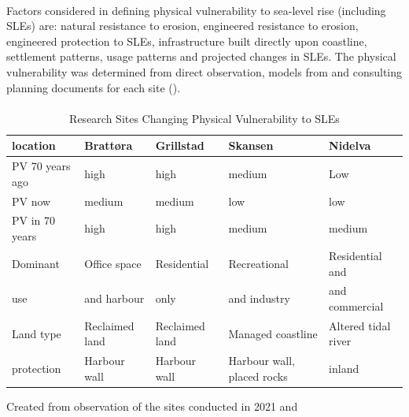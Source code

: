 \paragraph{}


Factors considered in defining physical vulnerability to sea-level rise (including SLEs) are: natural resistance to erosion, engineered resistance to erosion, engineered protection to SLEs, infrastructure built directly upon coastline, settlement patterns, usage patterns and projected changes in SLEs. The physical vulnerability was determined from direct observation,  models from \cite{kartverket_se_2020} and consulting planning documents for each site (\cite{miljoenheten_og_byplankontoret_trondheim_kommune_9-notat-om-havnivastigning-og-stormflo---hensyn-i-arealplanlegging-nyhavnapdf_2020}). 


\paragraph{}
\begin{table}[!ht]
    \centering
    \begin{tabular}{|l|l|l|l|l|}
    \hline
        \textbf{location} & \textbf{Brattøra} & \textbf{Grillstad} & \textbf{Skansen}  & \textbf{Nidelva} \\ \hline
        PV 70 years ago & high & high & medium & Low \\ \hline
        PV now &  medium &  medium &  low &  low \\ \hline
        PV in 70 years &  high &  high &  medium &  medium \\ \hline
        Dominant & Office space  & Residential & Recreational  & Residential and \\ \newline
        use & and harbour &  only   &  and industry & and commercial  \\ \hline
        Land type & Reclaimed land & Reclaimed land & Managed coastline  & Altered tidal river \\ \hline
        protection & Harbour wall & Harbour wall & Harbour wall, placed rocks & inland \\ \hline
    \end{tabular}
    \caption{ Research Sites Changing Physical Vulnerability to SLEs}{Created from observation of the sites conducted in 2021 and \cite{kartverket_se_2020}}
    \label{table:research_site}
\end{table}

